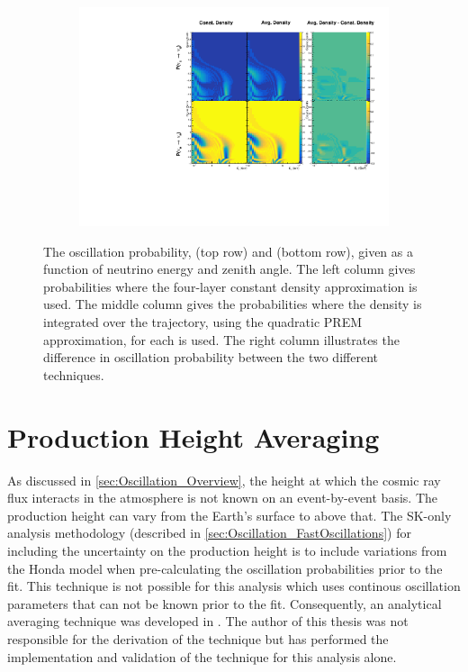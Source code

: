 \begin{figure}[h]
  \begin{subfigure}[t]{\textwidth}
    \includegraphics[width=\textwidth, trim={0mm 0mm 0mm 0mm}, clip,page=1]{Figures/Oscillation/AverageDensityPREMModel.pdf}
  \end{subfigure}
  \caption{The oscillation probability,  (top row) and  (bottom row), given as a function of neutrino energy and zenith angle. The left column gives probabilities where the four-layer constant density approximation is used. The middle column gives the probabilities where the density is integrated over the trajectory, using the quadratic PREM approximation, for each  is used. The right column illustrates the difference in oscillation probability between the two different techniques.}
  \label{fig:Oscillation_SK_AverageDensityPREMModel}
\end{figure}

\clearpage

\section{Production Height Averaging}
\label{sec:Oscillation_ProdHAvergaing}

As discussed in \autoref{sec:Oscillation_Overview}, the height at which the cosmic ray flux interacts in the atmosphere is not known on an event-by-event basis. The production height can vary from the Earth's surface to  above that. The SK-only analysis methodology (described in \autoref{sec:Oscillation_FastOscillations}) for including the uncertainty on the production height is to include variations from the Honda model when pre-calculating the oscillation probabilities prior to the fit. This technique is not possible for this analysis which uses continous oscillation parameters that can not be known prior to the fit. Consequently, an analytical averaging technique was developed in \cite{t2k_tn_425}. The author of this thesis was not responsible for the derivation of the technique but has performed the implementation and validation of the technique for this analysis alone.

